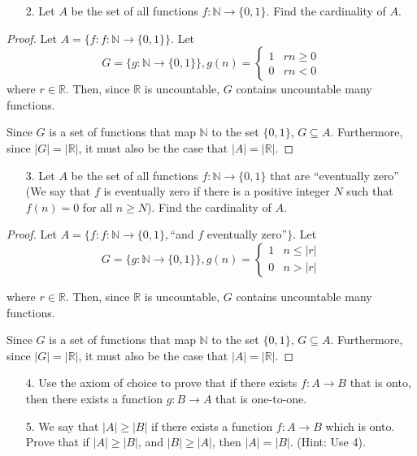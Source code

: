 \documentclass[10pt]{article}
\theoremstyle{definition}
\theoremstyle{plain}
\newcommand{\N}{\mathbb{N}}
\newcommand{\R}{\mathbb{R}}
\begin{document}
\pagebreak



\begin{enumerate}
\item[2.] Let $A$ be the set of all functions $f:\N \to \{0,1\}$.  Find the cardinality of $A$.
\end{enumerate}

\begin{proof}
  Let $A = \{f: f:\N \to \{0,1\}\}$. Let
  $$G=\{g:\N\to\{0,1\}\}, g(n) = \begin{cases}
      1 & rn\geq 0 \\
      0 & rn<0
   \end{cases}$$
  where $r\in\R$. Then, since $\R$ is uncountable, $G$ contains uncountable many functions.

  Since $G$ is a set of functions that map $\N$ to the set $\{0,1\}$, $G\subseteq A$. Furthermore, since $|G|=|\R|$, it must also be the case that $|A|=|\R|$.
\end{proof}



\pagebreak



\begin{enumerate}
\item[3.] Let $A$ be the set of all functions $f:\N \to \{0,1\}$ that are ``eventually zero'' (We say that $f$ is eventually zero if there is a positive integer $N$ such that $f(n) = 0$ for all $n \geq N$).  Find the cardinality of $A$.
\end{enumerate}

\begin{proof}
  Let $A = \{f: f:\N \to \{0,1\}, $``and $f$ eventually zero''$\}$. Let
  $$G=\{g:\N\to\{0,1\}\},g(n) = \begin{cases}
    1 & n\leq |r| \\
    0 & n>|r|
   \end{cases}$$

  where $r\in\R$. Then, since $\R$ is uncountable, $G$ contains uncountable many functions.

  Since $G$ is a set of functions that map $\N$ to the set $\{0,1\}$, $G\subseteq A$. Furthermore, since $|G|=|\R|$, it must also be the case that $|A|=|\R|$.
\end{proof}


\pagebreak



\begin{enumerate}
\item[4.] Use the axiom of choice to prove that if there exists $f:A \to B$ that is onto, then there exists a function $g:B \to A$ that is one-to-one.
\end{enumerate}

\begin{enumerate}
\item[5.] We say that $|A| \geq |B|$ if there exists a function $f:A \to B$ which is onto.  Prove that if $|A| \geq |B|$, and $|B| \geq |A|$, then $|A| = |B|$.  (Hint:  Use 4).
\end{enumerate}
\end{document}
